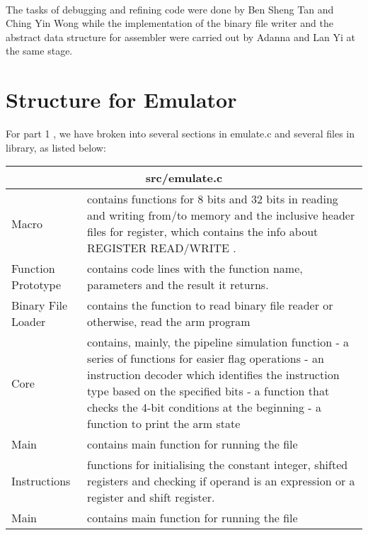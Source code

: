 \documentclass[11pt]{article}
\begin{document}
\bigskip

\\
The tasks of debugging and refining code were done by Ben Sheng Tan and Ching
Yin Wong while the implementation of the binary file writer and the abstract
data structure for assembler were carried out by Adanna and Lan Yi at the same
stage.\\

\pagebreak

\section{Structure for Emulator}

For part 1 , we have broken into several sections in emulate.c and several
files in library, as listed below:\\

\begin{tabular}{ |p{5cm}|p{10cm}| }
\hline
\multicolumn{2}{|c|}{src/emulate.c} \\
\hline
Macro & contains functions for 8 bits and 32 bits in reading and writing
from/to memory and the inclusive header files for register, which contains
the info about REGISTER READ/WRITE . \\
\hline
Function Prototype &  contains code lines with the function name, parameters
and the result it returns. \\
\hline
Binary File Loader & contains the function to read binary file reader or
otherwise, read the arm program \\
\hline
Core & contains, mainly, the pipeline simulation function - a series of
functions for easier flag operations - an instruction decoder which
identifies the instruction type based on the specified bits - a function that
checks the 4-bit conditions at the beginning - a function to print the arm
state \\
\hline
Main & contains main function for running the file \\
\hline
Instructions  & functions for initialising the constant integer, shifted registers
and checking if operand is an expression or a register and shift register. \\
\hline
Main & contains main function for running the file\\
\hline
\end{tabular}

\bigskip
\\
\end{document}
